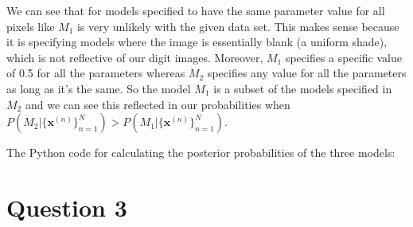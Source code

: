 \documentclass[12pt]{article}
\begin{document}
We can see that for models specified to have the same parameter value for all pixels like $M_1$ is very unlikely with the given data set. This makes sense because it is specifying models where the image is essentially blank (a uniform shade), which is not reflective of our digit images. Moreover, $M_1$ specifies a specific value of 0.5 for all the parameters whereas $M_2$ specifies any value for all the parameters as long as it's the same. So the model $M_1$ is a subset of the models specified in $M_2$ and we can see this reflected in our probabilities when $P(M_2|\{\textbf{x}^{(n)}\}_{n=1}^{N}) > P(M_1|\{\textbf{x}^{(n)}\}_{n=1}^{N})$.

\newpage
The Python code for calculating the posterior probabilities of the three models:

\newpage
\section*{Question 3}
\end{document}

